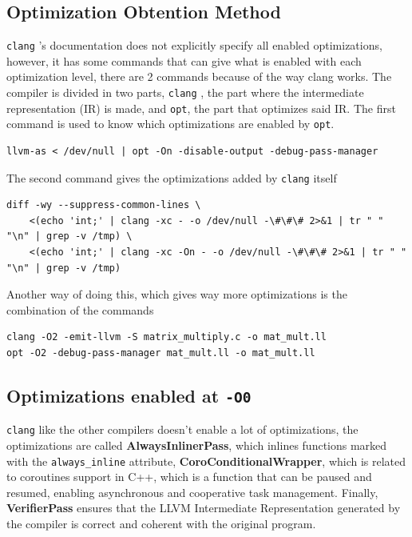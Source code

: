 \documentclass{rapport}
\newcommand{\clang}{\texttt{clang} }
\newcommand{\optizero}{\texttt{-O0} }
\begin{document}
\subsection*{Optimization Obtention Method}
\clang's documentation does not explicitly specify all enabled optimizations, however, it has some commands that can give what is enabled with each 
optimization level, there are 2 commands because of the way clang works. \newline
The compiler is divided in two parts, \clang, the part where the intermediate representation (IR) is made, and \texttt{opt}, the part that optimizes said IR. 
The first command is used to know which optimizations are enabled by \texttt{opt}.
\begin{verbatim}
llvm-as < /dev/null | opt -On -disable-output -debug-pass-manager
\end{verbatim}
The second command gives the optimizations added by \clang itself
\begin{verbatim}
diff -wy --suppress-common-lines \
    <(echo 'int;' | clang -xc - -o /dev/null -\#\#\# 2>&1 | tr " " "\n" | grep -v /tmp) \
    <(echo 'int;' | clang -xc -On - -o /dev/null -\#\#\# 2>&1 | tr " " "\n" | grep -v /tmp)
\end{verbatim}
Another way of doing this, which gives way more optimizations is the combination of the commands 
\begin{verbatim}
clang -O2 -emit-llvm -S matrix_multiply.c -o mat_mult.ll
opt -O2 -debug-pass-manager mat_mult.ll -o mat_mult.ll
\end{verbatim}

\subsection*{Optimizations enabled at \optizero}
\clang like the other compilers doesn't enable a lot of optimizations, the optimizations are called \textbf{AlwaysInlinerPass}, which inlines functions marked
with the \texttt{always\_inline} attribute, \textbf{CoroConditionalWrapper}, which is related to coroutines support in C++, which is a function that can be 
paused and resumed, enabling asynchronous and cooperative task management. Finally, \textbf{VerifierPass} ensures that the LLVM Intermediate Representation 
generated by the compiler is correct and coherent with the original program.
\end{document}
